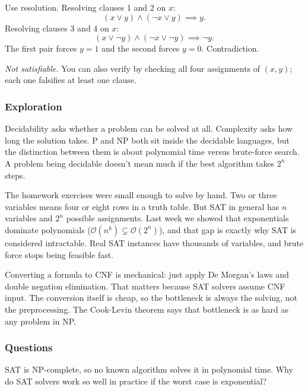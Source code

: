 \documentclass{article}
\theoremstyle{theorem}
\theoremstyle{definition}
\theoremstyle{remark}
\begin{document}
Use resolution. Resolving clauses 1 and 2 on $x$:
\[
  (x \lor y) \land (\lnot x \lor y) \implies y.
\]
Resolving clauses 3 and 4 on $x$:
\[
  (x \lor \lnot y) \land (\lnot x \lor \lnot y) \implies \lnot y.
\]
The first pair forces $y = 1$ and the second forces $y = 0$. Contradiction.

\emph{Not satisfiable.} You can also verify by checking all four assignments of $(x, y)$; each one falsifies at least one clause.

\subsubsection{Exploration}

Decidability asks whether a problem can be solved at all. Complexity asks how long the solution
takes. P and NP both sit inside the decidable languages, but the distinction between them is
about polynomial time versus brute-force search. A problem being decidable doesn't mean much
if the best algorithm takes $2^n$ steps.

The homework exercises were small enough to solve by hand. Two or three variables means four or
eight rows in a truth table. But SAT in general has $n$ variables and $2^n$ possible assignments.
Last week we showed that exponentials dominate polynomials
($\mathcal{O}(n^k) \subsetneq \mathcal{O}(2^n)$), and that gap is exactly why SAT is considered
intractable. Real SAT instances have thousands of variables, and brute force stops being
feasible fast.

Converting a formula to CNF is mechanical: just apply De Morgan's laws and double negation
elimination. That matters because SAT solvers assume CNF input. The conversion itself is cheap,
so the bottleneck is always the solving, not the preprocessing. The Cook-Levin theorem says
that bottleneck is as hard as any problem in NP.

\subsubsection{Questions}

SAT is NP-complete, so no known algorithm solves it in polynomial time. Why do SAT solvers work so well in practice if the worst case is exponential?
\end{document}
